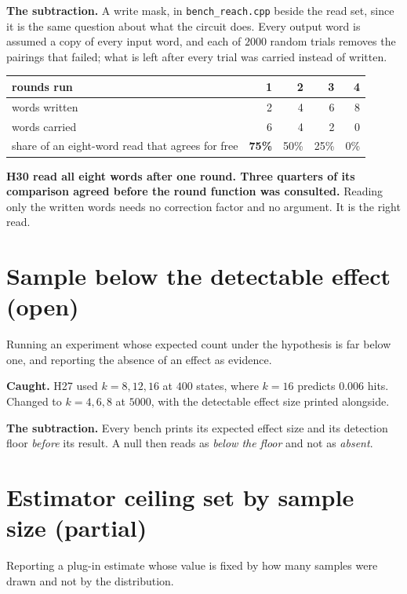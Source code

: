 \textbf{The subtraction.} A write mask, in \texttt{bench\_reach.cpp} beside the read set, since it is the same question about what the circuit does. Every output word is assumed a copy of every input word, and each of \(2000\) random trials removes the pairings that failed; what is left after every trial was carried instead of written.

\begin{center}
\begin{tabular}{@{}lrrrr@{}}
\toprule
rounds run & 1 & 2 & 3 & 4 \\
\midrule
words written & 2 & 4 & 6 & 8 \\
words carried & 6 & 4 & 2 & 0 \\
share of an eight-word read that agrees for free & \textbf{75\%} & 50\% & 25\% & 0\% \\
\bottomrule
\end{tabular}
\end{center}

\textbf{H30 read all eight words after one round. Three quarters of its comparison agreed before the round function was consulted.} Reading only the written words needs no correction factor and no argument. It is the right read.

\section{Sample below the detectable effect (open)}

Running an experiment whose expected count under the hypothesis is far below one, and reporting the absence of an effect as evidence.

\textbf{Caught.} H27 used \(k = 8, 12, 16\) at \(400\) states, where \(k = 16\) predicts \(0.006\) hits. Changed to \(k = 4, 6, 8\) at \(5000\), with the detectable effect size printed alongside.

\textbf{The subtraction.} Every bench prints its expected effect size and its detection floor \emph{before} its result. A null then reads as \emph{below the floor} and not as \emph{absent}.

\section{Estimator ceiling set by sample size (partial)}

Reporting a plug-in estimate whose value is fixed by how many samples were drawn and not by the distribution.

